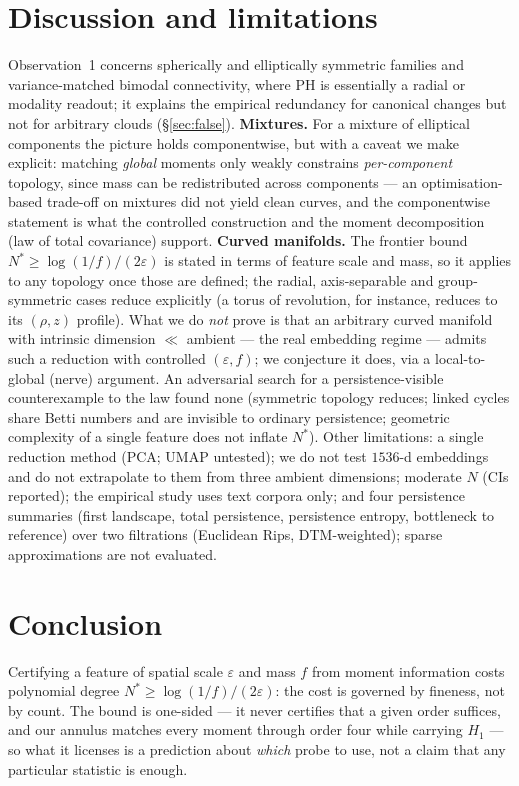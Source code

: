 \documentclass[11pt]{article}
\theoremstyle{remark}
\begin{document}
\section{Discussion and limitations}\label{sec:disc}
Observation~1 concerns spherically and elliptically symmetric families and variance-matched
bimodal connectivity, where PH is essentially a radial or modality readout; it
explains the empirical redundancy for canonical changes but not for arbitrary clouds
(\S\ref{sec:false}). \textbf{Mixtures.} For a mixture of elliptical components the picture holds
componentwise, but with a caveat we make explicit: matching \emph{global} moments only weakly
constrains \emph{per-component} topology, since mass can be redistributed across components ---
an optimisation-based trade-off on mixtures did not yield clean curves, and the componentwise
statement is what the controlled construction and the moment decomposition (law of total
covariance) support. \textbf{Curved manifolds.} The frontier bound $N^*\ge\log(1/f)/(2\varepsilon)$ is stated in terms of
feature scale and mass, so it applies to any topology once those are defined; the radial,
axis-separable and group-symmetric cases reduce explicitly (a torus of revolution, for instance,
reduces to its $(\rho,z)$ profile). What we do \emph{not} prove is that an arbitrary curved
manifold with intrinsic dimension $\ll$ ambient --- the real embedding regime --- admits such a
reduction with controlled $(\varepsilon,f)$; we conjecture it does, via a local-to-global (nerve)
argument. An adversarial search for a persistence-visible counterexample to the law found none
(symmetric topology reduces; linked cycles share Betti numbers and are invisible to ordinary
persistence; geometric complexity of a single feature does not inflate $N^*$).
Other limitations: a single reduction method (PCA; UMAP untested); we do not test $1536$-d
embeddings and do not extrapolate to them from three ambient dimensions; moderate $N$ (CIs
reported); the empirical study uses text corpora only; and four persistence summaries (first landscape, total persistence, persistence entropy,
bottleneck to reference) over two filtrations (Euclidean Rips, DTM-weighted); sparse
approximations are not evaluated.

\section{Conclusion}
Certifying a feature of spatial scale $\varepsilon$ and mass $f$ from moment information costs
polynomial degree $N^*\ge\log(1/f)/(2\varepsilon)$: the cost is governed by fineness, not by count.
The bound is one-sided --- it never certifies that a given order suffices, and our annulus matches
every moment through order four while carrying $H_1$ --- so what it licenses is a prediction about
\emph{which} probe to use, not a claim that any particular statistic is enough.
\end{document}
